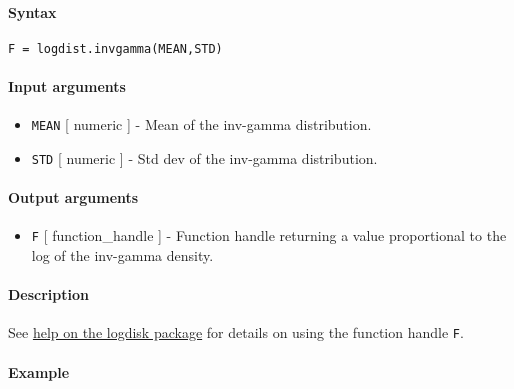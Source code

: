 


	\paragraph{Syntax}

\begin{verbatim}
F = logdist.invgamma(MEAN,STD)
\end{verbatim}

\paragraph{Input arguments}

\begin{itemize}
\item
  \texttt{MEAN} {[} numeric {]} - Mean of the inv-gamma distribution.
\item
  \texttt{STD} {[} numeric {]} - Std dev of the inv-gamma distribution.
\end{itemize}

\paragraph{Output arguments}

\begin{itemize}
\itemsep1pt\parskip0pt
\item
  \texttt{F} {[} function\_handle {]} - Function handle returning a
  value proportional to the log of the inv-gamma density.
\end{itemize}

\paragraph{Description}

See \href{logdist/Contents}{help on the logdisk package} for details on
using the function handle \texttt{F}.

\paragraph{Example}


